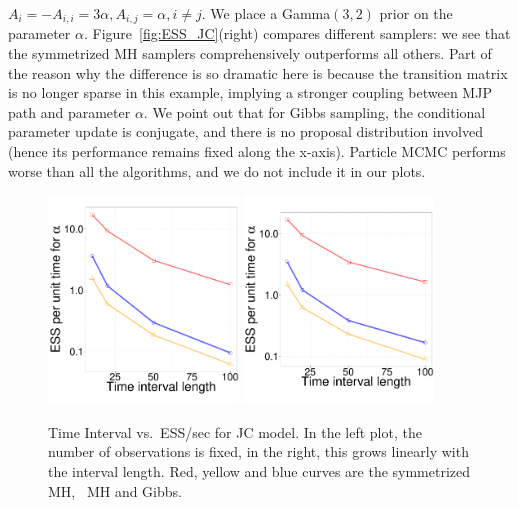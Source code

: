 {$A_i = -A_{i,i} = 3\alpha, A_{i, j} = \alpha,i \neq j.$
We place a Gamma$(3,2)$ prior on the parameter $\alpha$.
Figure~\ref{fig:ESS_JC}(right) compares different samplers: we see that the
symmetrized MH samplers comprehensively outperforms all others.
Part of the reason why the difference is so dramatic here is because the
transition matrix is no longer sparse in this example, implying a stronger
coupling between MJP path and parameter $\alpha$. We point out that for Gibbs
sampling, the conditional parameter update is conjugate, and there is no
proposal distribution involved (hence its performance remains fixed along
the x-axis). Particle MCMC performs worse
than all the algorithms, and we do not include it in our plots.
  \begin{figure}%
  \centering
  \begin{minipage}[!hp]{0.73\linewidth}
  \centering
    \includegraphics [width=0.45\textwidth, angle=0]{figs/ESS_vs_t_alpha_JC.pdf}
	\vspace{.3in}
  \centering
    \includegraphics [width=0.45\textwidth, angle=0]{figs/ESS_vs_t_alpha_fixobservation_JC.pdf}
  \end{minipage}
  \begin{minipage}[!hp]{0.25\linewidth}
    \caption{Time Interval vs.\ ESS/sec for JC model. In the left plot, the number of 
    observations is fixed, in the right, this grows linearly with the
  interval length. Red, yellow and blue curves are the symmetrized MH,
  \naive\ MH and Gibbs. }
	\label{fig:jc_model_vs_t}
  \end{minipage}
  \vspace{-.4in}
  \end{figure}

}
